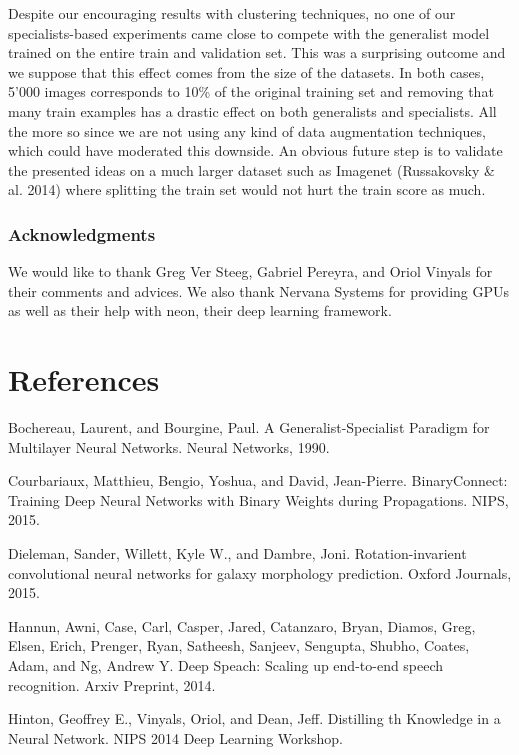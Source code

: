 \documentclass[12pt]{article}
\begin{document}
Despite our encouraging results with clustering techniques, no one of
our specialists-based experiments came close to compete with the
generalist model trained on the entire train and validation set. This
was a surprising outcome and we suppose that this effect comes from the
size of the datasets. In both cases, 5'000 images corresponds to 10\% of
the original training set and removing that many train examples has a
drastic effect on both generalists and specialists. All the more so
since we are not using any kind of data augmentation techniques, which
could have moderated this downside. An obvious future step is to
validate the presented ideas on a much larger dataset such as Imagenet
(Russakovsky \& al. 2014) where splitting the train set would not hurt
the train score as much.

\subsubsection{Acknowledgments}\label{acknowledgments}

We would like to thank Greg Ver Steeg, Gabriel Pereyra, and Oriol
Vinyals for their comments and advices. We also thank Nervana Systems
for providing GPUs as well as their help with neon, their deep learning
framework.

\section{References}\label{references}

Bochereau, Laurent, and Bourgine, Paul. A Generalist-Specialist Paradigm
for Multilayer Neural Networks. Neural Networks, 1990.

Courbariaux, Matthieu, Bengio, Yoshua, and David, Jean-Pierre.
BinaryConnect: Training Deep Neural Networks with Binary Weights during
Propagations. NIPS, 2015.

Dieleman, Sander, Willett, Kyle W., and Dambre, Joni. Rotation-invarient
convolutional neural networks for galaxy morphology prediction. Oxford
Journals, 2015.

Hannun, Awni, Case, Carl, Casper, Jared, Catanzaro, Bryan, Diamos, Greg,
Elsen, Erich, Prenger, Ryan, Satheesh, Sanjeev, Sengupta, Shubho,
Coates, Adam, and Ng, Andrew Y. Deep Speach: Scaling up end-to-end
speech recognition. Arxiv Preprint, 2014.

Hinton, Geoffrey E., Vinyals, Oriol, and Dean, Jeff. Distilling th
Knowledge in a Neural Network. NIPS 2014 Deep Learning Workshop.
\end{document}
